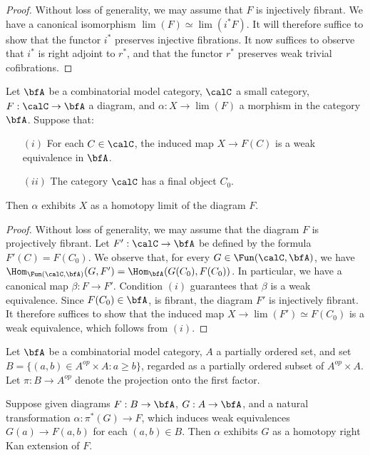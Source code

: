 \begin{Simplicial Categories}
\begin{proof}
Without loss of generality, we may assume that $F$ is injectively fibrant.
We have a canonical isomorphism $\lim(F) \simeq \lim( i^{\ast} F )$.
It will therefore suffice to show that the functor $i^{\ast}$ preserves injective fibrations.
It now suffices to observe that $i^{\ast}$ is right adjoint to $r^{\ast}$, and that
the functor $r^{\ast}$ preserves weak trivial cofibrations.
\end{proof}

\begin{lemma}\label{constancy}
Let $\bfA$ be a combinatorial model category, $\calC$ a small category, $F: \calC \rightarrow \bfA$ a diagram, and $\alpha: X \rightarrow \lim(F)$ a morphism in the category $\bfA$.
Suppose that:
\begin{itemize}
\item[$(i)$] For each $C \in \calC$, the induced map $X \rightarrow F(C)$ is a weak equivalence in $\bfA$.
\item[$(ii)$] The category $\calC$ has a final object $C_0$. 
\end{itemize}
Then $\alpha$ exhibits $X$ as a homotopy limit of the diagram $F$.
\end{lemma}

\begin{proof}
Without loss of generality, we may assume that the diagram $F$ is projectively fibrant.
Let $F': \calC \rightarrow \bfA$ be defined by the formula $F'(C) = F(C_0)$.
We observe that, for every $G \in \Fun(\calC, \bfA)$, we have
$\Hom_{ \Fun(\calC, \bfA) }( G, F') = \Hom_{\bfA}( G(C_0), F(C_0) )$. In particular,
we have a canonical map $\beta: F \rightarrow F'$. Condition $(i)$ guarantees that
$\beta$ is a weak equivalence. Since
$F(C_0) \in \bfA$, is fibrant, the diagram $F'$ is injectively fibrant. It therefore suffices to show that
the induced map $X \rightarrow \lim(F') \simeq F(C_0)$ is a weak equivalence, which follows from
$(i)$.
\end{proof}

\begin{lemma}\label{stride}
Let $\bfA$ be a combinatorial model category,
$A$ a partially ordered set, and set $B = \{ (a,b) \in A^{op} \times A: a \geq b \}$,
regarded as a partially ordered subset of $A^{op} \times A$. Let
$\pi: B \rightarrow A^{op}$ denote the projection onto the first factor.

Suppose given diagrams $F: B \rightarrow \bfA$, $G: A \rightarrow \bfA$,
and a natural transformation $\alpha: \pi^{\ast}(G) \rightarrow F$, which induces
weak equivalences $G(a) \rightarrow F(a,b)$ for each $(a,b) \in B$.
Then $\alpha$ exhibits $G$ as a homotopy right Kan extension of $F$.
\end{lemma}


\end{Simplicial Categories}
